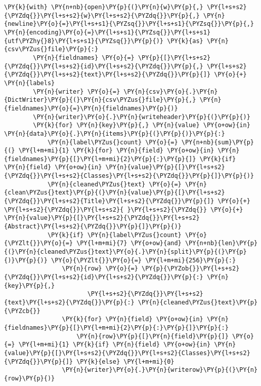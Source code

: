 \documentclass[../main.tex]{subfiles}
\begin{document}
\begin{tcolorbox}[breakable, size=fbox, boxrule=1pt, pad at break*=1mm,colback=cellbackground, colframe=cellborder]
\begin{Verbatim}[commandchars=\\\{\}]
    \PY{k}{with} \PY{n+nb}{open}\PY{p}{(}\PY{n}{w}\PY{p}{,} \PY{l+s+s2}{\PYZdq{}}\PY{l+s+s2}{w}\PY{l+s+s2}{\PYZdq{}}\PY{p}{,} \PY{n}{newline}\PY{o}{=}\PY{l+s+s1}{\PYZsq{}}\PY{l+s+s1}{\PYZsq{}}\PY{p}{,} \PY{n}{encoding}\PY{o}{=}\PY{l+s+s1}{\PYZsq{}}\PY{l+s+s1}{utf\PYZhy{}8}\PY{l+s+s1}{\PYZsq{}}\PY{p}{)} \PY{k}{as} \PY{n}{csv\PYZus{}file}\PY{p}{:}
        \PY{n}{fieldnames} \PY{o}{=} \PY{p}{[}\PY{l+s+s2}{\PYZdq{}}\PY{l+s+s2}{id}\PY{l+s+s2}{\PYZdq{}}\PY{p}{,} \PY{l+s+s2}{\PYZdq{}}\PY{l+s+s2}{text}\PY{l+s+s2}{\PYZdq{}}\PY{p}{]} \PY{o}{+} \PY{n}{labels}
        \PY{n}{writer} \PY{o}{=} \PY{n}{csv}\PY{o}{.}\PY{n}{DictWriter}\PY{p}{(}\PY{n}{csv\PYZus{}file}\PY{p}{,} \PY{n}{fieldnames}\PY{o}{=}\PY{n}{fieldnames}\PY{p}{)}
        \PY{n}{writer}\PY{o}{.}\PY{n}{writeheader}\PY{p}{(}\PY{p}{)}
        \PY{k}{for} \PY{n}{key}\PY{p}{,} \PY{n}{value} \PY{o+ow}{in} \PY{n}{data}\PY{o}{.}\PY{n}{items}\PY{p}{(}\PY{p}{)}\PY{p}{:}
            \PY{n}{label\PYZus{}count} \PY{o}{=} \PY{n+nb}{sum}\PY{p}{(} \PY{l+m+mi}{1} \PY{k}{for} \PY{n}{field} \PY{o+ow}{in} \PY{n}{fieldnames}\PY{p}{[}\PY{l+m+mi}{2}\PY{p}{:}\PY{p}{]} \PY{k}{if} \PY{n}{field} \PY{o+ow}{in} \PY{n}{value}\PY{p}{[}\PY{l+s+s2}{\PYZdq{}}\PY{l+s+s2}{Classes}\PY{l+s+s2}{\PYZdq{}}\PY{p}{]}\PY{p}{)}
            \PY{n}{cleaned\PYZus{}text} \PY{o}{=} \PY{n}{clean\PYZus{}text}\PY{p}{(}\PY{n}{value}\PY{p}{[}\PY{l+s+s2}{\PYZdq{}}\PY{l+s+s2}{Title}\PY{l+s+s2}{\PYZdq{}}\PY{p}{]} \PY{o}{+} \PY{l+s+s2}{\PYZdq{}}\PY{l+s+s2}{ }\PY{l+s+s2}{\PYZdq{}} \PY{o}{+} \PY{n}{value}\PY{p}{[}\PY{l+s+s2}{\PYZdq{}}\PY{l+s+s2}{Abstract}\PY{l+s+s2}{\PYZdq{}}\PY{p}{]}\PY{p}{)}
            \PY{k}{if} \PY{n}{label\PYZus{}count} \PY{o}{\PYZlt{}}\PY{o}{=} \PY{l+m+mi}{7} \PY{o+ow}{and} \PY{n+nb}{len}\PY{p}{(}\PY{n}{cleaned\PYZus{}text}\PY{o}{.}\PY{n}{split}\PY{p}{(}\PY{p}{)}\PY{p}{)} \PY{o}{\PYZlt{}}\PY{o}{=} \PY{l+m+mi}{256}\PY{p}{:}
                \PY{n}{row} \PY{o}{=} \PY{p}{\PYZob{}}\PY{l+s+s2}{\PYZdq{}}\PY{l+s+s2}{id}\PY{l+s+s2}{\PYZdq{}}\PY{p}{:} \PY{n}{key}\PY{p}{,}
                       \PY{l+s+s2}{\PYZdq{}}\PY{l+s+s2}{text}\PY{l+s+s2}{\PYZdq{}}\PY{p}{:} \PY{n}{cleaned\PYZus{}text}\PY{p}{\PYZcb{}}
                \PY{k}{for} \PY{n}{field} \PY{o+ow}{in} \PY{n}{fieldnames}\PY{p}{[}\PY{l+m+mi}{2}\PY{p}{:}\PY{p}{]}\PY{p}{:}
                    \PY{n}{row}\PY{p}{[}\PY{n}{field}\PY{p}{]} \PY{o}{=} \PY{l+m+mi}{1} \PY{k}{if} \PY{n}{field} \PY{o+ow}{in} \PY{n}{value}\PY{p}{[}\PY{l+s+s2}{\PYZdq{}}\PY{l+s+s2}{Classes}\PY{l+s+s2}{\PYZdq{}}\PY{p}{]} \PY{k}{else} \PY{l+m+mi}{0}
                \PY{n}{writer}\PY{o}{.}\PY{n}{writerow}\PY{p}{(}\PY{n}{row}\PY{p}{)}



\end{Verbatim}
\end{tcolorbox}
\end{document}
